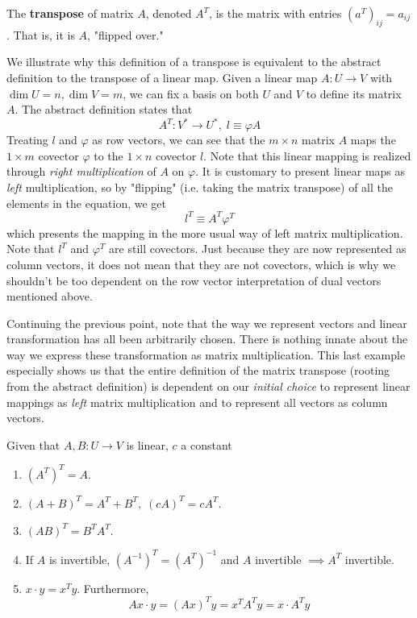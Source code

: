   \begin{definition}
    The \textbf{transpose} of matrix $A$, denoted $A^T$, is the matrix with entries $(a^T)_{i j} = a_{i j}$. That is, it is $A$, "flipped over." 
  \end{definition}

  We illustrate why this definition of a transpose is equivalent to the abstract definition to the transpose of a linear map. Given a linear map $A: U \longrightarrow V$ with $\dim U = n, \dim V = m$, we can fix a basis on both $U$ and $V$ to define its matrix $A$. The abstract definition states that 
  \begin{equation}
    A^T: V^\ast \longrightarrow U^\ast, \; l \equiv \varphi A
  \end{equation}
  Treating $l$ and $\varphi$ as row vectors, we can see that the $m \times n$ matrix $A$ maps the $1 \times m$ covector $\varphi$ to the $1 \times n$ covector $l$. Note that this linear mapping is realized through \textit{right multiplication} of $A$ on $\varphi$. It is customary to present linear maps as \textit{left} multiplication, so by "flipping" (i.e. taking the matrix transpose) of all the elements in the equation, we get 
  \begin{equation}
    l^T \equiv A^T \varphi^T
  \end{equation}
  which presents the mapping in the more usual way of left matrix multiplication. Note that $l^T$ and $\varphi^T$ are still covectors. Just because they are now represented as column vectors, it does not mean that they are not covectors, which is why we shouldn't be too dependent on the row vector interpretation of dual vectors mentioned above.  

  Continuing the previous point, note that the way we represent vectors and linear transformation has all been arbitrarily chosen. There is nothing innate about the way we express these transformation as matrix multiplication. This last example especially shows us that the entire definition of the matrix transpose (rooting from the abstract definition) is dependent on our \textit{initial choice} to represent linear mappings as \textit{left} matrix multiplication and to represent all vectors as column vectors. 

  \begin{theorem}
    Given that $A, B: U \longrightarrow V$ is linear, $c$ a constant
    \begin{enumerate}
      \item $(A^T)^T = A$. 
      \item $(A+B)^T = A^T + B^T, \; (c A)^T = c A^T$. 
      \item $(A B)^T = B^T A^T$. 
      \item If $A$ is invertible, $(A^{-1})^T = (A^T)^{-1}$ and $A$ invertible $\implies A^T$ invertible. 
      \item $x \cdot y = x^T y$. Furthermore, 
      \begin{equation}
        Ax \cdot y = (A x)^T y = x^T A^T y = x \cdot A^T y
      \end{equation}
    \end{enumerate}
  \end{theorem}


